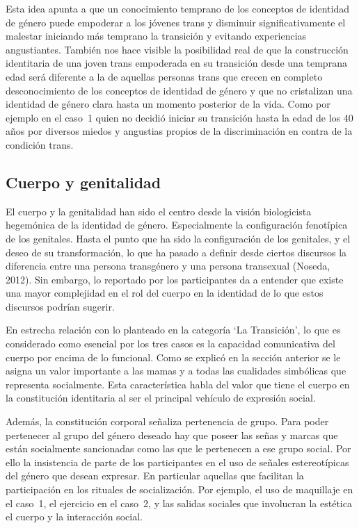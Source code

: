 Esta idea apunta a que un conocimiento temprano de los conceptos de identidad de
género puede empoderar a los jóvenes trans y disminuir significativamente el
malestar iniciando más temprano la transición y evitando experiencias
angustiantes. También nos hace visible la posibilidad real de que la
construcción identitaria de una joven trans empoderada en su transición desde
una temprana edad será diferente a la de aquellas personas trans que crecen en
completo desconocimiento de los conceptos de identidad de género y que no
cristalizan una identidad de género clara hasta un momento posterior de la vida.
Como por ejemplo en el caso~1 quien no decidió iniciar su transición hasta la
edad de los 40 años por diversos miedos y angustias propios de la discriminación
en contra de la condición trans.

\subsection{Cuerpo y genitalidad}

El cuerpo y la genitalidad han sido el centro desde la visión biologicista
hegemónica de la identidad de género. Especialmente la configuración fenotípica
de los genitales. Hasta el punto que ha sido la configuración de los genitales,
y el deseo de su transformación, lo que ha pasado a definir desde ciertos
discursos la diferencia entre una persona transgénero y una persona transexual
(Noseda, 2012). Sin embargo, lo reportado por los participantes da a entender
que existe una mayor complejidad en el rol del cuerpo en la identidad de lo que
estos discursos podrían sugerir.

En estrecha relación con lo planteado en la categoría ‘La Transición’, lo que es
considerado como esencial por los tres casos es la capacidad comunicativa del
cuerpo por encima de lo funcional. Como se explicó en la sección anterior se le
asigna un valor importante a las mamas y a todas las cualidades simbólicas que
representa socialmente. Esta característica habla del valor que tiene el cuerpo
en la constitución identitaria al ser el principal vehículo de expresión social.

Además, la constitución corporal señaliza pertenencia de grupo. Para poder
pertenecer al grupo del género deseado hay que poseer las señas y marcas que
están socialmente sancionadas como las que le pertenecen a ese grupo social. Por
ello la insistencia de parte de los participantes en el uso de señales
estereotípicas del género que desean expresar. En particular aquellas que
facilitan la participación en los rituales de socialización. Por ejemplo, el uso
de maquillaje en el caso~1, el ejercicio en el caso~2, y las salidas sociales
que involucran la estética el cuerpo y la interacción social.

